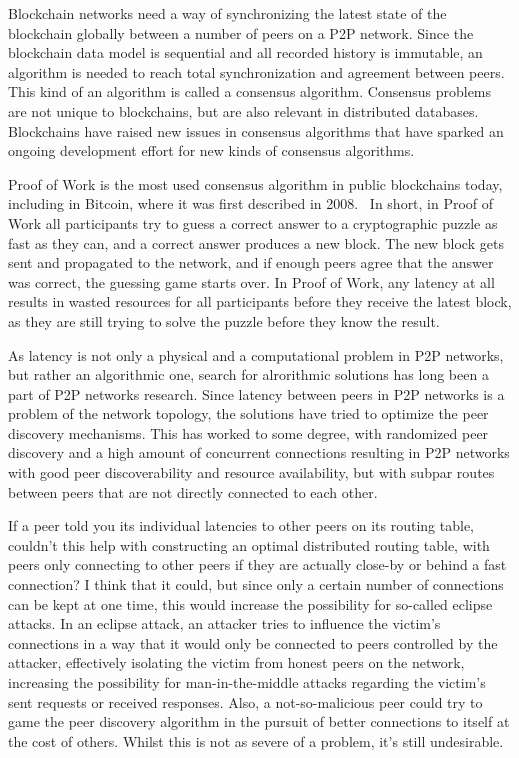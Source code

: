 Blockchain networks need a way of synchronizing the latest state of the blockchain globally between a number of peers on a P2P network. Since the blockchain data model is sequential and all recorded history is immutable, an algorithm is needed to reach total synchronization and agreement between peers. This kind of an algorithm is called a consensus algorithm. Consensus problems are not unique to blockchains, but are also relevant in distributed databases. Blockchains have raised new issues in consensus algorithms that have sparked an ongoing development effort for new kinds of consensus algorithms.

Proof of Work is the most used consensus algorithm in public blockchains today, including in Bitcoin, where it was first described in 2008.~\cite{Nakamoto2019-ax} In short, in Proof of Work all participants try to guess a correct answer to a cryptographic puzzle as fast as they can, and a correct answer produces a new block. The new block gets sent and propagated to the network, and if enough peers agree that the answer was correct, the guessing game starts over. In Proof of Work, any latency at all results in wasted resources for all participants before they receive the latest block, as they are still trying to solve the puzzle before they know the result.

As latency is not only a physical and a computational problem in P2P networks, but rather an algorithmic one, search for alrorithmic solutions has long been a part of P2P networks research. Since latency between peers in P2P networks is a problem of the network topology, the solutions have tried to optimize the peer discovery mechanisms. This has worked to some degree, with randomized peer discovery and a high amount of concurrent connections resulting in P2P networks with good peer discoverability and resource availability, but with subpar routes between peers that are not directly connected to each other.

If a peer told you its individual latencies to other peers on its routing table, couldn't this help with constructing an optimal distributed routing table, with peers only connecting to other peers if they are actually close-by or behind a fast connection? I think that it could, but since only a certain number of connections can be kept at one time, this would increase the possibility for so-called eclipse attacks. In an eclipse attack, an attacker tries to influence the victim's connections in a way that it would only be connected to peers controlled by the attacker, effectively isolating the victim from honest peers on the network, increasing the possibility for man-in-the-middle attacks regarding the victim's sent requests or received responses. Also, a not-so-malicious peer could try to game the peer discovery algorithm in the pursuit of better connections to itself at the cost of others. Whilst this is not as severe of a problem, it's still undesirable.

